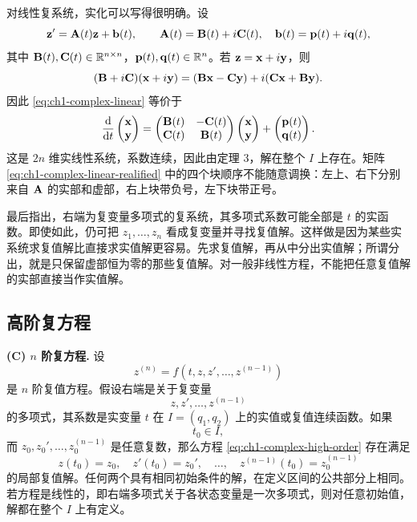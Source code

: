 对线性复系统，实化可以写得很明确。设
\begin{equation}
 \vect{z}'=\mat{A}(t)\vect{z}+\vect{b}(t),
 \qquad
 \mat{A}(t)=\mat{B}(t)+i\mat{C}(t),
 \quad
 \vect{b}(t)=\vect{p}(t)+i\vect{q}(t),
 \label{eq:ch1-complex-linear}
\end{equation}
其中 \(\mathbf{B}(t),\mathbf{C}(t)\in\mathbb R^{n\times n}\)，\(\vect{p}(t),\vect{q}(t)\in\R^n\)。若 \(\vect{z}=\vect{x}+i\vect{y}\)，则
\[
 (\mat{B}+i\mat{C})(\vect{x}+i\vect{y})
 =(\mat{B}\vect{x}-\mat{C}\vect{y})+i(\mat{C}\vect{x}+\mat{B}\vect{y}).
\]
因此 \eqref{eq:ch1-complex-linear} 等价于
\begin{equation}
 \frac{\dd}{\dd t}
 \begin{pmatrix}
  \vect{x}\\\vect{y}
 \end{pmatrix}
 =
 \begin{pmatrix}
  \mat{B}(t)&-\mat{C}(t)\\
  \mat{C}(t)&\mat{B}(t)
 \end{pmatrix}
 \begin{pmatrix}
  \vect{x}\\\vect{y}
 \end{pmatrix}
 +
 \begin{pmatrix}
  \vect{p}(t)\\\vect{q}(t)
 \end{pmatrix}.
 \label{eq:ch1-complex-linear-realified}
\end{equation}
这是 \(2n\) 维实线性系统，系数连续，因此由定理 3，解在整个 \(I\) 上存在。矩阵 \eqref{eq:ch1-complex-linear-realified} 中的四个块顺序不能随意调换：左上、右下分别来自 \(\mathbf{A}\) 的实部和虚部，右上块带负号，左下块带正号。

最后指出，右端为复变量多项式的复系统，其多项式系数可能全部是 \(t\) 的实函数。即使如此，仍可把 \(z_1,\ldots,z_n\) 看成复变量并寻找复值解。这样做是因为某些实系统求复值解比直接求实值解更容易。先求复值解，再从中分出实值解；所谓分出，就是只保留虚部恒为零的那些复值解。对一般非线性方程，不能把任意复值解的实部直接当作实值解。

\subsection{高阶复方程}

\textbf{(C) \(n\) 阶复方程.} 设
\begin{equation}
 z^{(n)}
 =f(t,z,z',\ldots,z^{(n-1)})
 \label{eq:ch1-complex-high-order}
\end{equation}
是 \(n\) 阶复值方程。假设右端是关于复变量
\[
 z,z',\ldots,z^{(n-1)}
\]
的多项式，其系数是实变量 \(t\) 在 \(I=(q_1,q_2)\) 上的实值或复值连续函数。如果
\[
 t_0\in I,
\]
而 \(z_0,z_0',\ldots,z_0^{(n-1)}\) 是任意复数，那么方程 \eqref{eq:ch1-complex-high-order} 存在满足
\begin{equation}
 z(t_0)=z_0,
 \quad
 z'(t_0)=z_0',
 \quad
 \ldots,
 \quad
 z^{(n-1)}(t_0)=z_0^{(n-1)}
 \label{eq:ch1-complex-high-order-initial}
\end{equation}
的局部复值解。任何两个具有相同初始条件的解，在定义区间的公共部分上相同。若方程是线性的，即右端多项式关于各状态变量是一次多项式，则对任意初始值，解都在整个 \(I\) 上有定义。

